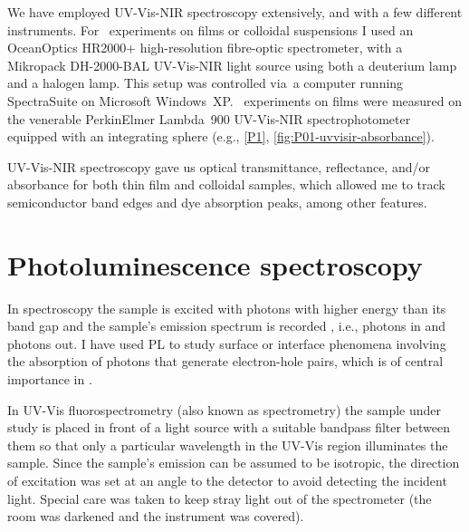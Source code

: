 \documentclass[webedition,openright,titles,swedish,english]{LuaUUThesis}\usepackage[]{graphicx}\usepackage[]{xcolor}
\newcommand{\ie}{i.e.}
\newcommand{\eg}{e.g.}
\newcommand{\via}{via}
\begin{document}
We have employed \gls{UV-Vis-NIR} spectroscopy extensively, and with a few
different instruments.
For \insitu\ experiments on films or colloidal suspensions I used an
OceanOptics HR2000+ high-resolution fibre-optic spectrometer,
with a Mikropack DH-2000-BAL \gls{UV-Vis-NIR} light source using
both a deuterium lamp and a halogen lamp.
This setup was controlled \via\ a computer running SpectraSuite on Microsoft Windows~XP.
\Exsitu\ experiments on films were measured on the venerable PerkinElmer Lambda~900
\gls{UV-Vis-NIR} spectrophotometer equipped with an integrating sphere
(\eg, \cref{P1}, \cref{fig:P01-uvvisir-absorbance}).

\Gls{UV-Vis-NIR} spectroscopy gave us optical transmittance, reflectance, and/or absorbance
for both thin film and colloidal samples, which allowed me to track semiconductor band edges
and dye absorption peaks, among other features.



\section{Photoluminescence spectroscopy}
\label{methods:photolum}

In  spectroscopy the sample is excited with photons with higher
energy than its band gap and the sample's emission spectrum is recorded \cite{Pazoki2020},
\ie, photons in and photons out.
I have used \gls{PL} to study surface or interface phenomena involving
the absorption of photons that generate electron-hole pairs, which is of central
importance in  \cite{Kundu2011a}.

In \gls{UV-Vis} fluorospectrometry (also known as  spectrometry)
the sample under study is placed in front of a light source with a suitable bandpass filter
between them so that only a particular wavelength in the \gls{UV-Vis} region illuminates the sample.
Since the sample's emission can be assumed to be isotropic, the direction of excitation was set at
an angle to the detector to avoid detecting the incident light.
Special care was taken to keep stray light out of the spectrometer
(the room was darkened and the instrument was covered).
\end{document}
